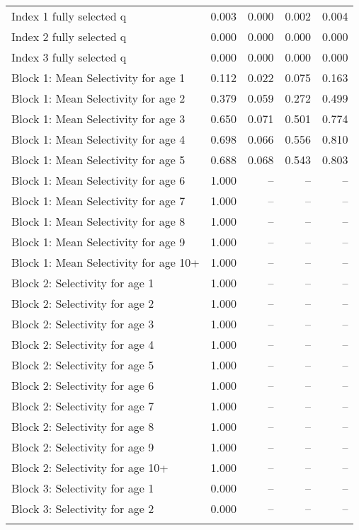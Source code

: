 \documentclass[
]{article}
\begin{document}
\begin{landscape}
\begin{longtable}[t]{lrrrr}
\endfoot
\bottomrule
\endlastfoot
Index 1 fully selected q & 0.003 & 0.000 & 0.002 & 0.004\\
Index 2 fully selected q & 0.000 & 0.000 & 0.000 & 0.000\\
Index 3 fully selected q & 0.000 & 0.000 & 0.000 & 0.000\\
Block 1: Mean Selectivity for age 1 & 0.112 & 0.022 & 0.075 & 0.163\\
Block 1: Mean Selectivity for age 2 & 0.379 & 0.059 & 0.272 & 0.499\\
\addlinespace
Block 1: Mean Selectivity for age 3 & 0.650 & 0.071 & 0.501 & 0.774\\
Block 1: Mean Selectivity for age 4 & 0.698 & 0.066 & 0.556 & 0.810\\
Block 1: Mean Selectivity for age 5 & 0.688 & 0.068 & 0.543 & 0.803\\
Block 1: Mean Selectivity for age 6 & 1.000 & -- & -- & --\\
Block 1: Mean Selectivity for age 7 & 1.000 & -- & -- & --\\
\addlinespace
Block 1: Mean Selectivity for age 8 & 1.000 & -- & -- & --\\
Block 1: Mean Selectivity for age 9 & 1.000 & -- & -- & --\\
Block 1: Mean Selectivity for age 10+ & 1.000 & -- & -- & --\\
Block 2: Selectivity for age 1 & 1.000 & -- & -- & --\\
Block 2: Selectivity for age 2 & 1.000 & -- & -- & --\\
\addlinespace
Block 2: Selectivity for age 3 & 1.000 & -- & -- & --\\
Block 2: Selectivity for age 4 & 1.000 & -- & -- & --\\
Block 2: Selectivity for age 5 & 1.000 & -- & -- & --\\
Block 2: Selectivity for age 6 & 1.000 & -- & -- & --\\
Block 2: Selectivity for age 7 & 1.000 & -- & -- & --\\
\addlinespace
Block 2: Selectivity for age 8 & 1.000 & -- & -- & --\\
Block 2: Selectivity for age 9 & 1.000 & -- & -- & --\\
Block 2: Selectivity for age 10+ & 1.000 & -- & -- & --\\
Block 3: Selectivity for age 1 & 0.000 & -- & -- & --\\
Block 3: Selectivity for age 2 & 0.000 & -- & -- & --\\
\addlinespace

\end{longtable}
\end{landscape}
\end{document}
